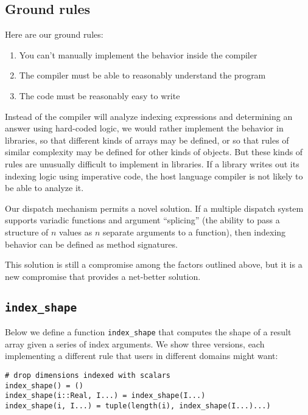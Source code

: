 \documentclass[preprint]{sigplanconf}
\begin{document}
\subsection{Ground rules}
Here are our ground rules:

\begin{enumerate}
\item You can't manually implement the behavior inside the compiler
\item The compiler must be able to reasonably understand the program
\item The code must be reasonably easy to write
\end{enumerate}

Instead of the compiler will analyze indexing expressions and determining an answer
using hard-coded logic, we would rather implement the
behavior in libraries, so that different kinds of arrays may be defined, or so
that rules of similar complexity may be defined for other kinds of objects.
But these kinds of rules are unusually difficult to implement in libraries. If
a library writes out its indexing logic using imperative code, the host
language compiler is not likely to be able to analyze it. 

Our dispatch mechanism permits a novel solution. If a multiple dispatch system
supports variadic functions and argument ``splicing'' (the ability to pass a
structure of $n$ values as $n$ separate arguments to a function), then
indexing behavior can be defined as method signatures.

This solution is still a compromise among the factors outlined above, but it
is a new compromise that provides a net-better solution.


\subsection{\texttt{index\_shape}}

Below we define a function \texttt{index\_shape} that computes the shape of a
result array given a series of index arguments. We show three versions, each
implementing a different rule that users in different domains might want:

\begin{verbatim}
# drop dimensions indexed with scalars
index_shape() = ()
index_shape(i::Real, I...) = index_shape(I...)
index_shape(i, I...) = tuple(length(i), index_shape(I...)...)
\end{verbatim}
\end{document}
